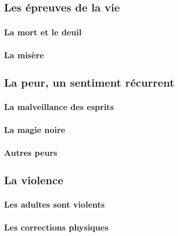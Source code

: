 \documentclass[a4paper, 11pt, hidelinks]{article}
\begin{document}
\subsection{Les épreuves de la vie}


\subsubsection{La mort et le deuil}




\subsubsection{La misère}





\subsection{La peur, un sentiment récurrent}


\subsubsection{La malveillance des esprits}


\subsubsection{La magie noire}



\subsubsection{Autres peurs}




\subsection{La violence}

\subsubsection{Les adultes sont violents}




\subsubsection{Les corrections physiques}
\end{document}
